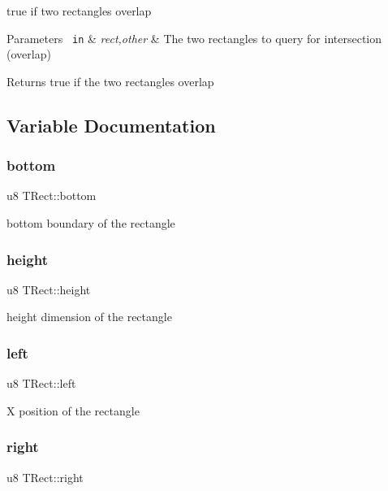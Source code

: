 true if two rectangles overlap


\begin{DoxyParams}[1]{Parameters}
\mbox{\texttt{ in}}  & {\em rect,other} & The two rectangles to query for intersection (overlap)\\
\hline
\end{DoxyParams}
\begin{DoxyReturn}{Returns}
true if the two rectangles overlap 
\end{DoxyReturn}


\subsection{Variable Documentation}
\mbox{\label{group__TRect_ga225c7bff13bd2bb02d55a517f4c34eb2}} 
\subsubsection{\texorpdfstring{bottom}{bottom}}
{\footnotesize\ttfamily u8 T\+Rect\+::bottom}

bottom boundary of the rectangle \mbox{\label{group__TRect_ga8808bb53b01ed90c0d41b3360a9f6b95}} 
\subsubsection{\texorpdfstring{height}{height}}
{\footnotesize\ttfamily u8 T\+Rect\+::height}

height dimension of the rectangle \mbox{\label{group__TRect_gabf4bc428ae2b560efda3c60687a73f00}} 
\subsubsection{\texorpdfstring{left}{left}}
{\footnotesize\ttfamily u8 T\+Rect\+::left}

X position of the rectangle \mbox{\label{group__TRect_gae2a5778c81eb1e464703e1a563e7dcf0}} 
\subsubsection{\texorpdfstring{right}{right}}
{\footnotesize\ttfamily u8 T\+Rect\+::right}

